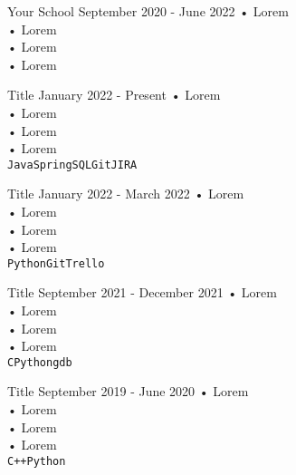 \documentclass[9pt]{developercv} %
\begin{document}
\vspace{0.5cm}



\begin{entrylist}
	\entry
		{}
		{Your School}
		{September 2020 - June 2022}
		{•   Lorem\\
		•	Lorem\\
		•	Lorem\\
		•	Lorem
		}
\end{entrylist}



\begin{entrylist}
	\entry
        {}
		{Title}
		{January 2022 - Present}
		{•   Lorem\\
		•	Lorem\\
		•	Lorem\\
		•	Lorem\\
		\texttt{Java}\slashsep\texttt{Spring}\slashsep\texttt{SQL}\slashsep\texttt{Git}\slashsep\texttt{JIRA}}
		
    \entry
        {}
        {Title}
        {January 2022 - March 2022}
        {•   Lorem\\
		•	Lorem\\
		•	Lorem\\
		•	Lorem\\
        \texttt{Python}\slashsep\texttt{Git}\slashsep\texttt{Trello}}
        
	\entry
        {}
		{Title}
		{September 2021 - December 2021}
		{•   Lorem\\
		•	Lorem\\
		•	Lorem\\
		•	Lorem\\
		\texttt{C}\slashsep\texttt{Python}\slashsep\texttt{gdb}}
		
	\entry
        {}
		{Title}
		{September 2019 - June 2020}
		{•   Lorem\\
		•	Lorem\\
		•	Lorem\\
		•	Lorem\\
		\texttt{C++}\slashsep\texttt{Python}}

\end{entrylist}
\end{document}
